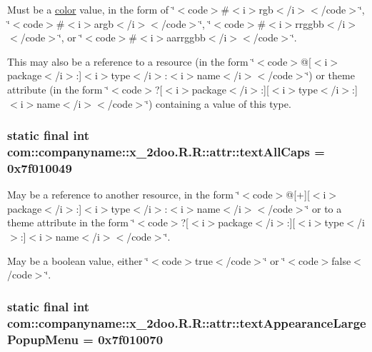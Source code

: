 Must be a \hyperlink{classcom_1_1companyname_1_1x__2doo_1_1_r_1_1color}{color} value, in the form of \char`\"{}$<$code$>$\#$<$i$>$rgb$<$/i$>$$<$/code$>$\char`\"{}, \char`\"{}$<$code$>$\#$<$i$>$argb$<$/i$>$$<$/code$>$\char`\"{}, \char`\"{}$<$code$>$\#$<$i$>$rrggbb$<$/i$>$$<$/code$>$\char`\"{}, or \char`\"{}$<$code$>$\#$<$i$>$aarrggbb$<$/i$>$$<$/code$>$\char`\"{}. 

This may also be a reference to a resource (in the form \char`\"{}$<$code$>$@\mbox{[}$<$i$>$package$<$/i$>$:\mbox{]}$<$i$>$type$<$/i$>$:$<$i$>$name$<$/i$>$$<$/code$>$\char`\"{}) or theme attribute (in the form \char`\"{}$<$code$>$?\mbox{[}$<$i$>$package$<$/i$>$:\mbox{]}\mbox{[}$<$i$>$type$<$/i$>$:\mbox{]}$<$i$>$name$<$/i$>$$<$/code$>$\char`\"{}) containing a value of this type. \hypertarget{classcom_1_1companyname_1_1x__2doo_1_1_r_1_1attr_440c890fd0d9d20178637dc0b7939341}{
\subsubsection[{textAllCaps}]{\setlength{\rightskip}{0pt plus 5cm}static final int com::companyname::x\_\-2doo.R.R::attr::textAllCaps = 0x7f010049}}
\label{classcom_1_1companyname_1_1x__2doo_1_1_r_1_1attr_440c890fd0d9d20178637dc0b7939341}


May be a reference to another resource, in the form \char`\"{}$<$code$>$@\mbox{[}+\mbox{]}\mbox{[}$<$i$>$package$<$/i$>$:\mbox{]}$<$i$>$type$<$/i$>$:$<$i$>$name$<$/i$>$$<$/code$>$\char`\"{} or to a theme attribute in the form \char`\"{}$<$code$>$?\mbox{[}$<$i$>$package$<$/i$>$:\mbox{]}\mbox{[}$<$i$>$type$<$/i$>$:\mbox{]}$<$i$>$name$<$/i$>$$<$/code$>$\char`\"{}. 

May be a boolean value, either \char`\"{}$<$code$>$true$<$/code$>$\char`\"{} or \char`\"{}$<$code$>$false$<$/code$>$\char`\"{}. \hypertarget{classcom_1_1companyname_1_1x__2doo_1_1_r_1_1attr_eb9c1b382bfb6774cca7ca009e4b8b12}{
\subsubsection[{textAppearanceLargePopupMenu}]{\setlength{\rightskip}{0pt plus 5cm}static final int com::companyname::x\_\-2doo.R.R::attr::textAppearanceLargePopupMenu = 0x7f010070}}
\label{classcom_1_1companyname_1_1x__2doo_1_1_r_1_1attr_eb9c1b382bfb6774cca7ca009e4b8b12}


